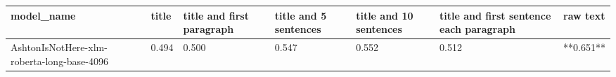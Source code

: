 \begin{tabular}{lllllll}
\toprule
                                model\_name & title & title and first paragraph & title and 5 sentences & title and 10 sentences & title and first sentence each paragraph &  raw text \\
\midrule
AshtonIsNotHere-xlm-roberta-long-base-4096 & 0.494 &                     0.500 &                 0.547 &                  0.552 &                                   0.512 & **0.651** \\
\bottomrule
\end{tabular}
